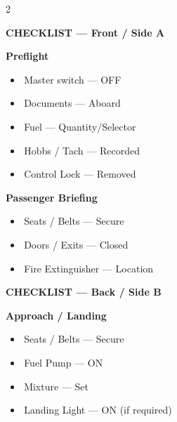 \documentclass[10pt]{article}
\newcommand{\checkbox}{\raisebox{0.0ex}{\fbox{\rule{0pt}{1.25ex}\rule{1.25ex}{0pt}}}\,}
\begin{document}
\begin{multicols}{2}
\raggedright

\vspace*{-3mm}
\begin{sectbox}
  {\small\textbf{CHECKLIST — Front / Side A}}
\end{sectbox}

\vspace{1mm}

\begin{sectbox}
  {\scriptsize\textbf{Preflight}}
\end{sectbox}
\vspace{1mm}
\begin{itemize}[left=0pt,label={},labelsep=2mm]
  \item \checkbox {\scriptsize Master switch --- OFF}
  \item \checkbox {\scriptsize Documents --- Aboard}
  \item \checkbox {\scriptsize Fuel --- Quantity/Selector}
  \item \checkbox {\scriptsize Hobbs / Tach --- Recorded}
  \item \checkbox {\scriptsize Control Lock --- Removed}
\end{itemize}

\vspace{1mm}
\begin{sectbox}
  {\scriptsize\textbf{Passenger Briefing}}
\end{sectbox}
\vspace{1mm}
\begin{itemize}[left=0pt,label={},labelsep=2mm]
  \item \checkbox {\scriptsize Seats / Belts --- Secure}
  \item \checkbox {\scriptsize Doors / Exits --- Closed}
  \item \checkbox {\scriptsize Fire Extinguisher --- Location}
\end{itemize}

\columnbreak

\begin{sectbox}
  {\small\textbf{CHECKLIST — Back / Side B}}
\end{sectbox}

\vspace{1mm}
\begin{sectbox}
  {\scriptsize\textbf{Approach / Landing}}
\end{sectbox}
\vspace{1mm}
\begin{itemize}[left=0pt,label={},labelsep=2mm]
  \item \checkbox {\scriptsize Seats / Belts --- Secure}
  \item \checkbox {\scriptsize Fuel Pump --- ON}
  \item \checkbox {\scriptsize Mixture --- Set}
  \item \checkbox {\scriptsize Landing Light --- ON (if required)}
\end{itemize}


\end{multicols}
\end{document}
